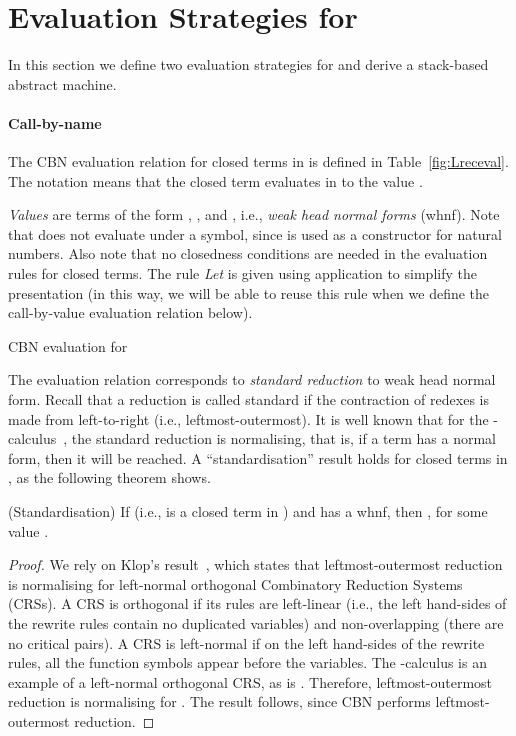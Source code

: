 \documentclass{article}
\begin{document}
\section{Evaluation Strategies for \LLCIrec}\label{sec:strat}
In this section we define two evaluation strategies for \LLCIrec and 
derive a stack-based abstract machine.
\paragraph{Call-by-name}
The CBN evaluation relation for closed terms in 
\LLCIrec is defined in Table~\ref{fig:Lreceval}. The notation 
 means that the closed
term  evaluates in \LLCIrec to the value .  

\emph{Values} 
are terms of the form , ,  and
, i.e., \emph{weak head normal forms} (whnf). Note that
\LLCIrec does not evaluate under a  symbol, since  is
used as a constructor for natural numbers.
Also note that no closedness
conditions are needed in the evaluation rules for closed terms.
The rule \emph{Let} is given using application to simplify the
presentation (in this way, we will be able to reuse this rule when we
define the call-by-value evaluation relation below).


\begin{table*}


\caption{CBN evaluation for \LLCIrec}\label{fig:Lreceval}
\end{table*}


The evaluation relation  corresponds to
\emph{standard reduction} to weak head normal form. Recall that a
reduction is called standard if the contraction of redexes is made
from left-to-right (i.e., leftmost-outermost).  It is well known that
for the -calculus~\cite{BarendregtHP:lamcss}, the standard
reduction is normalising, that is, if a term has a normal form, then
it will be reached. A ``standardisation'' result holds for closed
terms in , as the following theorem shows.

\begin{theorem}(Standardisation)
\label{th:standard} 
If  (i.e.,  is a closed term in
  ) and  has a whnf, then , for some
  value .
\end{theorem}
\begin{proof}
We rely on Klop's result~\cite{Klop-thesis,terese2005}, which states
that leftmost-outermost reduction 
is normalising for left-normal orthogonal Combinatory
Reduction Systems (CRSs). A CRS is orthogonal if its rules are
left-linear (i.e., the left hand-sides of the rewrite rules contain no
duplicated variables) and non-overlapping (there are no critical
pairs). A CRS is left-normal if on the left hand-sides of the rewrite
rules, all the function symbols appear before the variables.  The
-calculus is an example of a  left-normal orthogonal CRS, as
is  \LLCIrec. Therefore, leftmost-outermost reduction is normalising for .
The result follows, since CBN performs leftmost-outermost reduction.
\end{proof}
\end{document}
